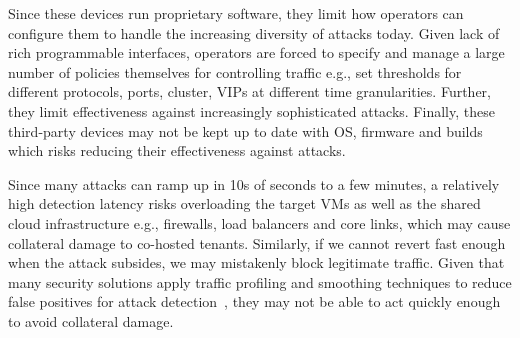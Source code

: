  Since these devices run proprietary software, they limit
how operators can configure them to handle the increasing diversity of attacks today. 
Given lack of rich programmable interfaces, 
operators are forced to specify and manage a large number of policies themselves  
for controlling traffic e.g., set thresholds for different protocols, ports, cluster, VIPs 
at different time granularities. Further, 
they limit effectiveness against increasingly 
sophisticated attacks.
Finally, these third-party devices may not be kept up to date with OS, firmware and builds which risks reducing their effectiveness against attacks. 

 Since many attacks can ramp up
in 10s of seconds to a few minutes, a
relatively high detection latency risks overloading the target VMs as
well as the shared cloud infrastructure e.g., firewalls, load
balancers and core links, which may cause collateral damage to
co-hosted tenants.  Similarly, if we cannot revert fast
enough when the attack subsides, we may mistakenly block legitimate
traffic. Given that many security solutions apply traffic
profiling and smoothing techniques to reduce false positives for
attack detection~\cite{peakflow}, they may not be able to act quickly
enough to avoid collateral damage.






